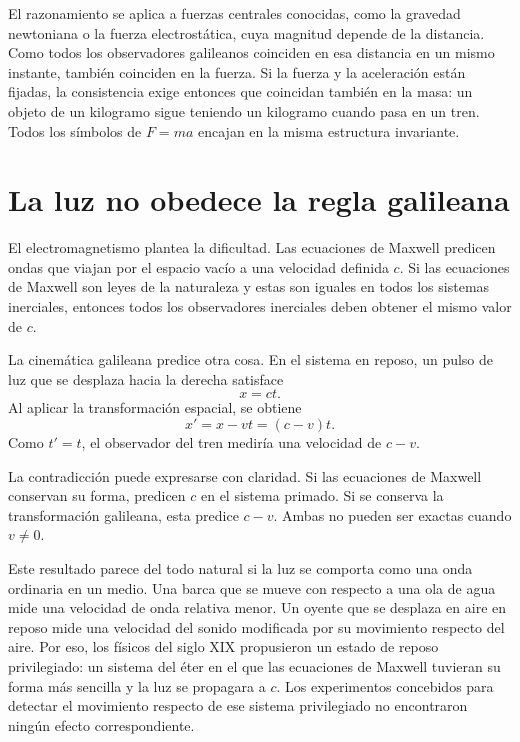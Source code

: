 El razonamiento se aplica a fuerzas centrales conocidas, como la gravedad newtoniana o la fuerza electrostática, cuya magnitud depende de la distancia. Como todos los observadores galileanos coinciden en esa distancia en un mismo instante, también coinciden en la fuerza. Si la fuerza y la aceleración están fijadas, la consistencia exige entonces que coincidan también en la masa: un objeto de un kilogramo sigue teniendo un kilogramo cuando pasa en un tren. Todos los símbolos de \(F=ma\) encajan en la misma estructura invariante.

\section{La luz no obedece la regla galileana}

El electromagnetismo plantea la dificultad. Las ecuaciones de Maxwell predicen ondas que viajan por el espacio vacío a una velocidad definida \(c\). Si las ecuaciones de Maxwell son leyes de la naturaleza y estas son iguales en todos los sistemas inerciales, entonces todos los observadores inerciales deben obtener el mismo valor de \(c\).

La cinemática galileana predice otra cosa. En el sistema en reposo, un pulso de luz que se desplaza hacia la derecha satisface
\begin{equation}
x=ct.
\end{equation}
Al aplicar la transformación espacial, se obtiene
\begin{equation}
x'=x-vt=(c-v)t.
\end{equation}
Como \(t'=t\), el observador del tren mediría una velocidad de \(c-v\).

La contradicción puede expresarse con claridad. Si las ecuaciones de Maxwell conservan su forma, predicen \(c\) en el sistema primado. Si se conserva la transformación galileana, esta predice \(c-v\). Ambas no pueden ser exactas cuando \(v\ne0\).

Este resultado parece del todo natural si la luz se comporta como una onda ordinaria en un medio. Una barca que se mueve con respecto a una ola de agua mide una velocidad de onda relativa menor. Un oyente que se desplaza en aire en reposo mide una velocidad del sonido modificada por su movimiento respecto del aire. Por eso, los físicos del siglo XIX propusieron un estado de reposo privilegiado: un sistema del éter en el que las ecuaciones de Maxwell tuvieran su forma más sencilla y la luz se propagara a \(c\). Los experimentos concebidos para detectar el movimiento respecto de ese sistema privilegiado no encontraron ningún efecto correspondiente.

